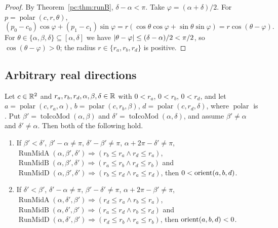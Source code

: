\begin{proof}
By Theorem~\ref{pc:thm:runB}, $\delta-\alpha<\pi$. Take $\varphi=(\alpha+\delta)/2$. For $p=\operatorname{polar}(c,r,\theta)$,
\[
  (p_0-c_0)\cos\varphi+(p_1-c_1)\sin\varphi=r(\cos\theta\cos\varphi+\sin\theta\sin\varphi)=r\cos(\theta-\varphi).
\]
For $\theta\in\{\alpha,\beta,\delta\}\subseteq[\alpha,\delta]$ we have
$\lvert\theta-\varphi\rvert\le(\delta-\alpha)/2<\pi/2$, so $\cos(\theta-\varphi)>0$; the radius $r\in\{r_a,r_b,r_d\}$ is
positive.
\end{proof}

\subsection{Arbitrary real directions}

\begin{theorem}\label{pc:thm:sign}
Let $c\in\mathbb R^2$ and $r_a,r_b,r_d,\alpha,\beta,\delta\in\mathbb R$ with $0<r_a$, $0<r_b$, $0<r_d$, and let
$a=\operatorname{polar}(c,r_a,\alpha)$, $b=\operatorname{polar}(c,r_b,\beta)$, $d=\operatorname{polar}(c,r_d,\delta)$,
where $\operatorname{polar}$ is . Put $\beta'=\operatorname{toIcoMod}(\alpha,\beta)$
and $\delta'=\operatorname{toIcoMod}(\alpha,\delta)$, and assume $\beta'\neq\alpha$ and $\delta'\neq\alpha$. Then
both of the following hold.
\begin{enumerate}[label=(\roman*)]
\item If $\beta'<\delta'$, $\beta'-\alpha\neq\pi$, $\delta'-\beta'\neq\pi$, $\alpha+2\pi-\delta'\neq\pi$,
  $\operatorname{RunMidA}(\alpha,\beta',\delta')\Rightarrow(r_b\le r_a\wedge r_d\le r_a)$,
  $\operatorname{RunMidB}(\alpha,\beta',\delta')\Rightarrow(r_a\le r_b\wedge r_d\le r_b)$ and
  $\operatorname{RunMidD}(\alpha,\beta',\delta')\Rightarrow(r_b\le r_d\wedge r_a\le r_d)$, then $0<\operatorname{orient}(a,b,d)$.
\item If $\delta'<\beta'$, $\delta'-\alpha\neq\pi$, $\beta'-\delta'\neq\pi$, $\alpha+2\pi-\beta'\neq\pi$,
  $\operatorname{RunMidA}(\alpha,\delta',\beta')\Rightarrow(r_d\le r_a\wedge r_b\le r_a)$,
  $\operatorname{RunMidB}(\alpha,\delta',\beta')\Rightarrow(r_a\le r_d\wedge r_b\le r_d)$ and
  $\operatorname{RunMidD}(\alpha,\delta',\beta')\Rightarrow(r_d\le r_b\wedge r_a\le r_b)$, then $\operatorname{orient}(a,b,d)<0$.
\end{enumerate}
\end{theorem}


